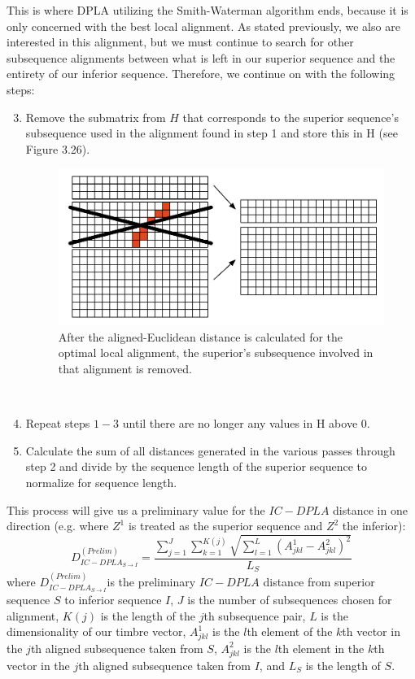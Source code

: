 \documentclass[a4paper,12pt]{report} 	%
\numberwithin{figure}{chapter}
\numberwithin{table}{chapter}
\numberwithin{equation}{chapter}
\begin{document}
\begin{flushleft}
This is where DPLA utilizing the Smith-Waterman algorithm ends, because it is only concerned with the best local alignment. As stated previously, we also are interested in this alignment, but we must continue to search for other subsequence alignments between what is left in our superior sequence and the entirety of our inferior sequence. Therefore, we continue on with the following steps:
\begin{enumerate}
\setcounter{enumi}{2}
\item Remove the submatrix from $H$ that corresponds to the superior sequence's subsequence used in the alignment found in step 1 and store this in H (see Figure 3.26).
\begin{figure}[h!]
\begin{center}
\includegraphics[scale=0.8]{SIC-DPLA_2}
\caption[Removing Optimal Subsequence]{After the aligned-Euclidean distance is calculated for the optimal local alignment, the superior's subsequence involved in that alignment is removed.}
\end{center}
\end{figure}
\\
\item Repeat steps $1-3$ until there are no longer any values in H above 0.
\item Calculate the sum of all distances generated in the various passes through step 2 and divide by the sequence length of the superior sequence to normalize for sequence length.
\end{enumerate}
This process will give us a preliminary value for the ${IC-DPLA}$ distance in one direction (e.g. where $Z^1$ is treated as the superior sequence and $Z^2$ the inferior):
\begin{equation}
D_{IC-DPLA_{S \to I}}^{(Prelim)} = \frac{\sum_{j=1}^J \sum_{k=1}^{K(j)} \sqrt{ \sum_{l=1}^L (A_{jkl}^1 - A_{jkl}^2)^2}}{L_S}
\end{equation}
where $D_{IC-DPLA_{S \to I}}^{(Prelim)} $is the preliminary $IC-DPLA$ distance from superior sequence $S$ to inferior sequence $I$, $J$ is the number of subsequences chosen for alignment, $K(j)$ is the length of the $j$th subsequence pair, $L$ is the dimensionality of our timbre vector, $A_{jkl}^1$ is the $l$th element of the $k$th vector in the $j$th aligned subsequence taken from $S$, $A_{jkl}^2$ is the $l$th element in the $k$th vector in the $j$th aligned subsequence taken from $I$, and $L_S$ is the length of $S$.


\end{flushleft}
\end{document}
